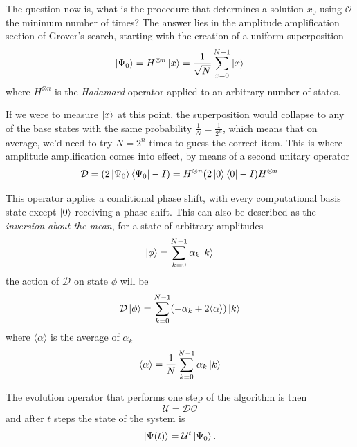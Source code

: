 \documentclass[../../dissertation.tex]{subfiles}
\begin{document}
The question now is, what is the procedure that determines a solution $x_0$ using $\mathcal{O}$ the minimum number of times? The answer lies in the amplitude amplification section of Grover's search, starting with the creation of a uniform superposition
\begin{equation}
	\ket{\Psi_0} = H^{\otimes n}\ket{x} = \frac{1}{\sqrt{N}}\sum_{x=0}^{N-1} \ket{x}
\end{equation}
where $H^{\otimes n}$ is the \textit{Hadamard} operator applied to an arbitrary number of states.\par
If we were to measure $\ket{x}$ at this point, the superposition would collapse to any of the base states with the same probability $\frac{1}{N} = \frac{1}{2^n}$, which means that on average, we'd need to try $N = 2^n$ times to guess the correct item. 
This is where amplitude amplification comes into effect, by means of a second unitary operator
\begin{equation}
	\mathcal{D} = (2\ket{\Psi_0}\bra{\Psi_0} - I) = H^{\otimes n}(2\ket{0}\bra{0} - I)H^{\otimes n}   
\end{equation}

This operator applies a conditional phase shift, with every computational basis state except $\ket{0}$ receiving a phase shift. This can also be described as the \textit{inversion about the mean}, for a state of arbitrary amplitudes
\begin{equation}
	\ket{\phi} = \sum_{k=0}^{N-1} \alpha_k\ket{k}
\end{equation}
the action of $\mathcal{D}$ on state $\phi$ will be
\begin{equation}
	\mathcal{D}\ket{\phi} = \sum_{k=0}^{N-1}(-\alpha_k + 2\langle \alpha \rangle)\ket{k}
\end{equation}
where $\langle \alpha \rangle$ is the average of $\alpha_k$
\begin{equation}
	\langle \alpha \rangle = \frac{1}{N} \sum_{k=0}^{N-1} \alpha_k\ket{k}
\end{equation}
\par
The evolution operator that performs one step of the algorithm is then
\begin{equation}
	\mathcal{U} = \mathcal{D}\mathcal{O}
\end{equation}
and after $t$ steps the state of the system is
\begin{equation}
	\ket{\Psi(t)} = \mathcal{U}^t\ket{\Psi_0}.
	\label{eq:groverFinalState}
\end{equation}\par
\end{document}
